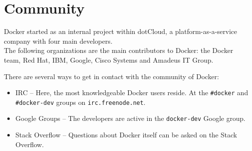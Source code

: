 \section{Community}
Docker started as an internal project within dotCloud, a platform-as-a-service company with four main developers. \\
The following organizations are the main contributors to Docker: the Docker team, Red Hat, IBM, Google, Cisco Systems and Amadeus IT Group. 

There are several ways to get in contact with the community of Docker:
\begin{itemize}
\item IRC -- Here, the most knowledgeable Docker users reside. At the \verb|#docker| and \verb|#docker-dev| groups on \verb|irc.freenode.net|.

\item Google Groups -- The developers are active in the \verb|docker-dev| Google group.

\item Stack Overflow -- Questions about Docker itself can be asked on the Stack Overflow. 
\end{itemize}